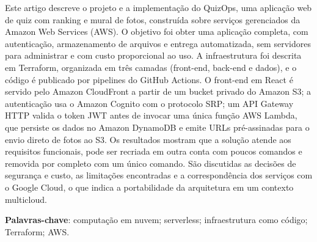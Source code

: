 \documentclass[article, 12pt, oneside, a4paper, english, brazil, sumario=tradicional]{abntex2}
\begin{document}
\frenchspacing

\maketitle

\begin{resumoumacoluna}
Este artigo descreve o projeto e a implementação do QuizOps, uma aplicação web de quiz com ranking e mural de fotos, construída sobre serviços gerenciados da Amazon Web Services (AWS). O objetivo foi obter uma aplicação completa, com autenticação, armazenamento de arquivos e entrega automatizada, sem servidores para administrar e com custo proporcional ao uso. A infraestrutura foi descrita em Terraform, organizada em três camadas (front-end, back-end e dados), e o código é publicado por pipelines do GitHub Actions. O front-end em React é servido pelo Amazon CloudFront a partir de um bucket privado do Amazon S3; a autenticação usa o Amazon Cognito com o protocolo SRP; um API Gateway HTTP valida o token JWT antes de invocar uma única função AWS Lambda, que persiste os dados no Amazon DynamoDB e emite URLs pré-assinadas para o envio direto de fotos ao S3. Os resultados mostram que a solução atende aos requisitos funcionais, pode ser recriada em outra conta com poucos comandos e removida por completo com um único comando. São discutidas as decisões de segurança e custo, as limitações encontradas e a correspondência dos serviços com o Google Cloud, o que indica a portabilidade da arquitetura em um contexto multicloud.

\textbf{Palavras-chave}: computação em nuvem; serverless; infraestrutura como código; Terraform; AWS.
\end{resumoumacoluna}
\end{document}
